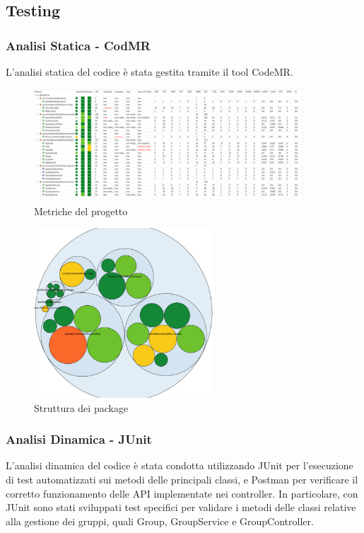 \subsection{Testing}
\subsubsection{Analisi Statica - CodMR}

L'analisi statica del codice è stata gestita tramite il tool CodeMR.

\begin{figure}[H]
    \centering
    \includegraphics[width=0.9\textwidth]{images/CodeMR_graph1.png}
    \caption{Metriche del progetto}
    \label{fig:CodeMR_1}
\end{figure}

\begin{figure}[H]
    \centering
    \includegraphics[width=0.6\textwidth]{images/CodeMR_graph2.png}
    \caption{Struttura dei package}
    \label{fig:CodeMR_2}
\end{figure}


\subsubsection{Analisi Dinamica - JUnit}

L'analisi dinamica del codice è stata condotta utilizzando JUnit per l'esecuzione di test automatizzati sui metodi delle principali classi, e Postman per verificare il corretto funzionamento delle API implementate nei controller.
In particolare, con JUnit sono stati sviluppati test specifici per validare i metodi delle classi relative alla gestione dei gruppi, quali Group, GroupService e GroupController.

